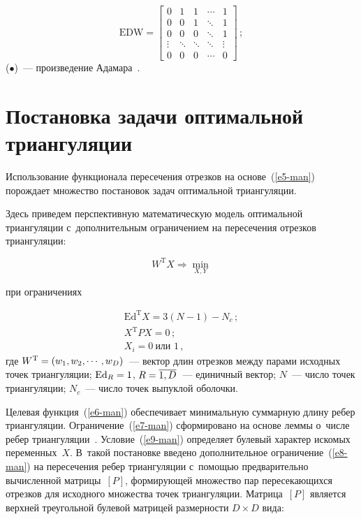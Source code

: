 \begin{multicols}{2}
\noindent
$$
\mathrm{EDW}=\begin{bmatrix}
0&1&1&\cdots& 1\\
0&0&1&\ddots &1\\
0&0&0&\ddots &1\\
\vdots& \ddots& \ddots& \ddots&\vdots\\
0&0&0&\cdots &0
\end{bmatrix}\,;
$$
($\bullet$)~--- произведение Адамара~\cite{11-man}.


\section{Постановка задачи оптимальной триангуляции}

  Использование функционала пересечения отрезков на основе~(\ref{e5-man}) 
по\-рож\-да\-ет множество по\-ста\-но\-вок задач оптимальной триангуляции.
  
  Здесь приведем перспективную математическую модель оптимальной 
триангуляции с~дополнительным ограничением на пересечения отрезков 
триангуляции:

\vspace*{2pt}

\noindent
  \begin{equation}
  W^{\mathrm{T}} X\Rightarrow \min\limits_{X,Y}
  \label{e6-man}
  \end{equation}
  
  \pagebreak
  
  \noindent
при ограничениях

\noindent
\begin{gather}
\mathrm{Ed}^{\mathrm{T}}X =3(N-1)-N_c\,;\label{e7-man}\\
X^{\mathrm{T}} P X=0\,;\label{e8-man}\\
X_i=0\ \mbox{или } 1\,, \label{e9-man}
\end{gather}
где $W^{\mathrm{T}}\hm= (w_1, w_2, \cdots, w_D)$~--- вектор длин отрезков 
между парами исходных точек триангуляции; $\mathrm{Ed}_R\hm=1$, $R\hm= 
\overline{1,D}$~--- единичный вектор; $N$~--- чис\-ло точек триангуляции;  
$N_c$~--- чис\-ло точек выпуклой оболочки.
  
  Целевая функция~(\ref{e6-man}) обеспечивает минимальную суммарную 
длину ребер триангуляции. Ограничение~(\ref{e7-man}) сформировано на 
основе леммы о~чис\-ле ребер триангуляции~\cite{6-man}.  
Условие~(\ref{e9-man}) определяет булевый характер искомых 
переменных~$X$. В~такой по\-ста\-нов\-ке введено дополнительное 
ограничение~(\ref{e8-man}) на пересечения ребер триангуляции с~по\-мощью 
предварительно вы\-чис\-лен\-ной мат\-ри\-цы~$[{P}]$, формирующей 
множество пар пересекающихся отрезков для исходного множества точек 
триангуляции. Мат\-ри\-ца~$[{P}]$ является верхней треугольной булевой 
мат\-ри\-цей раз\-мер\-ности $D\times D$ вида:


\end{multicols}
